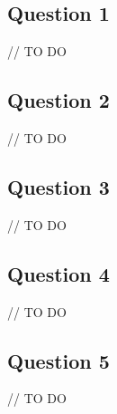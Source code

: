 \subsection{Question 1}

// TO DO


\subsection{Question 2}

// TO DO


\subsection{Question 3}

// TO DO


\subsection{Question 4}

// TO DO


\subsection{Question 5}

// TO DO